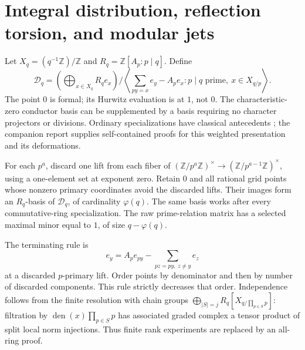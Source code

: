 \section{Integral distribution, reflection torsion, and modular jets}
\label{ir:insert:section}

Let $X_q=(q^{-1}\mathbb Z)/\mathbb Z$ and
$R_q=\mathbb Z[A_p:p\mid q]$. Define
\[
 \mathcal D_q=\left(\bigoplus_{x\in X_q}R_qe_x\right)
 \bigg/\left\langle\sum_{py=x}e_y-A_pe_x:
          p\mid q\text{ prime},\ x\in X_{q/p}\right\rangle.
\]
The point $0$ is formal; its Hurwitz evaluation is at $1$, not $0$.
The characteristic-zero conductor basis can be supplemented by a
basis requiring no character projectors or divisions. Ordinary
specializations have classical antecedents
\cite{ir:KubertSign1979,ir:Ouyang2002}; the companion report supplies
self-contained proofs for this weighted presentation and its deformations.

\begin{theorem}
\label{ir:insert:integral}
For each $p^a$, discard one lift from each fiber of
$(\mathbb Z/p^a\mathbb Z)^\times\to
 (\mathbb Z/p^{a-1}\mathbb Z)^\times$, using a one-element set at
exponent zero. Retain $0$ and all rational grid points whose nonzero
primary coordinates avoid the discarded lifts. Their images form an
$R_q$-basis of $\mathcal D_q$, of cardinality $\varphi(q)$.
The same basis works after every commutative-ring specialization.
The raw prime-relation matrix has a selected maximal minor equal to
$1$, of size $q-\varphi(q)$.
\end{theorem}
The terminating rule is
\[
 e_y=A_pe_{py}-\sum_{pz=py,\ z\ne y}e_z
\]
at a discarded $p$-primary lift. Order points by denominator and then
by number of discarded components. This rule strictly decreases that
order. Independence follows from the finite resolution with chain
groups $\bigoplus_{|S|=j}R_q[X_{q/\prod_{p\in S}p}]$: filtration by
$\operatorname{den}(x)\prod_{p\in S}p$ has associated graded complex
a tensor product of split local norm injections. Thus finite rank
experiments are replaced by an all-ring proof.


